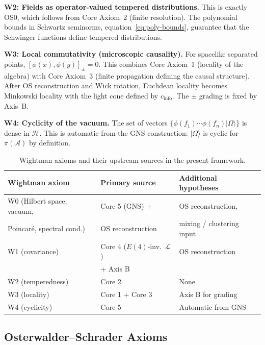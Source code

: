 \documentclass[12pt,a4paper]{article}
\theoremstyle{plain}
\theoremstyle{definition}
\theoremstyle{remark}
\newcommand{\hilb}{\mathcal{H}}
\newcommand{\alg}{\mathcal{A}}
\newcommand{\lag}{\mathcal{L}}
\begin{document}
\medskip

\noindent\textbf{W2: Fields as operator-valued tempered
  distributions.} This is exactly OS0, which follows from Core
Axiom~2 (finite resolution). The polynomial bounds in Schwartz
seminorms, equation~\eqref{eq:poly-bounds}, guarantee that the
Schwinger functions define tempered distributions.

\medskip

\noindent\textbf{W3: Local commutativity (microscopic causality).}
For spacelike separated points, $[\phi(x),\phi(y)]_\pm = 0$. This
combines Core Axiom~1 (locality of the algebra) with Core Axiom~3
(finite propagation defining the causal structure). After OS
reconstruction and Wick rotation, Euclidean locality becomes
Minkowski locality with the light cone defined by $c_{\mathrm{info}}$.
The $\pm$ grading is fixed by Axis~B.

\medskip

\noindent\textbf{W4: Cyclicity of the vacuum.} The set of vectors
$\{\phi(f_1)\cdots\phi(f_n)|\Omega\rangle\}$ is dense in $\hilb$.
This is automatic from the GNS construction: $|\Omega\rangle$ is
cyclic for $\pi(\alg)$ by definition.


\begin{table}[ht]
\centering
\renewcommand{\arraystretch}{1.2}
\begin{tabular}{@{}lll@{}}
\toprule
Wightman axiom & Primary source & Additional hypotheses \\
\midrule
W0 (Hilbert space, vacuum, & Core 5 (GNS) + & OS reconstruction, \\
\quad Poincar\'e, spectral cond.) & OS reconstruction & mixing / clustering input \\
W1 (covariance) & Core 4 ($E(4)$-inv.\ $\lag$) & OS reconstruction \\
 & + Axis B & \\
W2 (temperedness) & Core 2 & None \\
W3 (locality) & Core 1 + Core 3 & Axis B for grading \\
W4 (cyclicity) & Core 5 & Automatic from GNS \\
\bottomrule
\end{tabular}
\caption{Wightman axioms and their upstream sources in the present
  framework.}
\label{tab:wightman}
\end{table}


\subsection{Osterwalder--Schrader Axioms}
\end{document}
